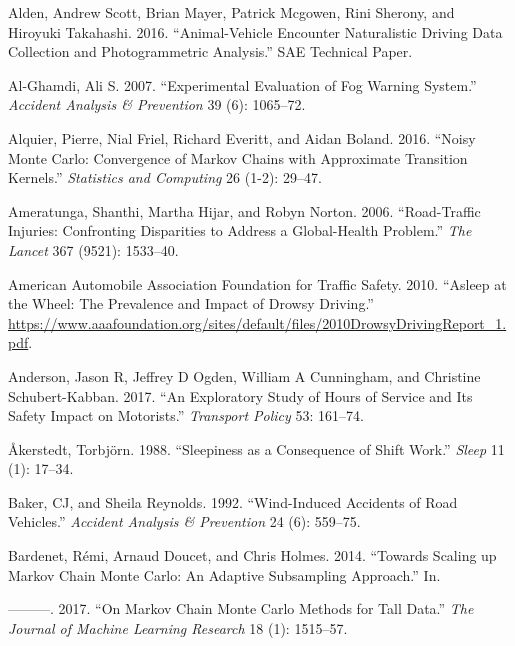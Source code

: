 \documentclass[12pt]{book}
\numberwithin{equation}{chapter}
\begin{document}
\leavevmode\hypertarget{ref-alden2016animal}{}%
Alden, Andrew Scott, Brian Mayer, Patrick Mcgowen, Rini Sherony, and Hiroyuki Takahashi. 2016. ``Animal-Vehicle Encounter Naturalistic Driving Data Collection and Photogrammetric Analysis.'' SAE Technical Paper.

\leavevmode\hypertarget{ref-al2007experimental}{}%
Al-Ghamdi, Ali S. 2007. ``Experimental Evaluation of Fog Warning System.'' \emph{Accident Analysis \& Prevention} 39 (6): 1065--72.

\leavevmode\hypertarget{ref-alquier2016noisy}{}%
Alquier, Pierre, Nial Friel, Richard Everitt, and Aidan Boland. 2016. ``Noisy Monte Carlo: Convergence of Markov Chains with Approximate Transition Kernels.'' \emph{Statistics and Computing} 26 (1-2): 29--47.

\leavevmode\hypertarget{ref-ameratunga2006road}{}%
Ameratunga, Shanthi, Martha Hijar, and Robyn Norton. 2006. ``Road-Traffic Injuries: Confronting Disparities to Address a Global-Health Problem.'' \emph{The Lancet} 367 (9521): 1533--40.

\leavevmode\hypertarget{ref-aaafoundation}{}%
American Automobile Association Foundation for Traffic Safety. 2010. ``Asleep at the Wheel: The Prevalence and Impact of Drowsy Driving.'' \url{https://www.aaafoundation.org/sites/default/files/2010DrowsyDrivingReport_1.pdf}.

\leavevmode\hypertarget{ref-anderson2017exploratory}{}%
Anderson, Jason R, Jeffrey D Ogden, William A Cunningham, and Christine Schubert-Kabban. 2017. ``An Exploratory Study of Hours of Service and Its Safety Impact on Motorists.'' \emph{Transport Policy} 53: 161--74.

\leavevmode\hypertarget{ref-aakerstedt1988sleepiness}{}%
Åkerstedt, Torbjörn. 1988. ``Sleepiness as a Consequence of Shift Work.'' \emph{Sleep} 11 (1): 17--34.

\leavevmode\hypertarget{ref-baker1992wind}{}%
Baker, CJ, and Sheila Reynolds. 1992. ``Wind-Induced Accidents of Road Vehicles.'' \emph{Accident Analysis \& Prevention} 24 (6): 559--75.

\leavevmode\hypertarget{ref-bardenet2014towards}{}%
Bardenet, Rémi, Arnaud Doucet, and Chris Holmes. 2014. ``Towards Scaling up Markov Chain Monte Carlo: An Adaptive Subsampling Approach.'' In.

\leavevmode\hypertarget{ref-bardenet2017markov}{}%
---------. 2017. ``On Markov Chain Monte Carlo Methods for Tall Data.'' \emph{The Journal of Machine Learning Research} 18 (1): 1515--57.
\end{document}
